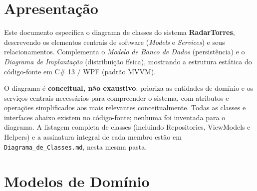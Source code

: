 %

\section{Apresentação}

Este documento especifica o diagrama de classes do sistema \textbf{RadarTorres}, descrevendo os
elementos centrais de software (\emph{Models} e \emph{Services}) e seus relacionamentos.
Complementa o \emph{Modelo de Banco de Dados} (persistência) e o \emph{Diagrama de Implantação}
(distribuição física), mostrando a estrutura estática do código-fonte em C\# 13 / WPF (padrão
MVVM).

O diagrama é \textbf{conceitual, não exaustivo}: prioriza as entidades de domínio e os serviços
centrais necessários para compreender o sistema, com atributos e operações simplificados aos
mais relevantes conceitualmente. Todas as classes e interfaces abaixo existem no código-fonte;
nenhuma foi inventada para o diagrama. A listagem completa de classes (incluindo Repositories,
ViewModels e Helpers) e a assinatura integral de cada membro estão em
\texttt{Diagrama\_de\_Classes.md}, nesta mesma pasta.

\section{Modelos de Domínio}

